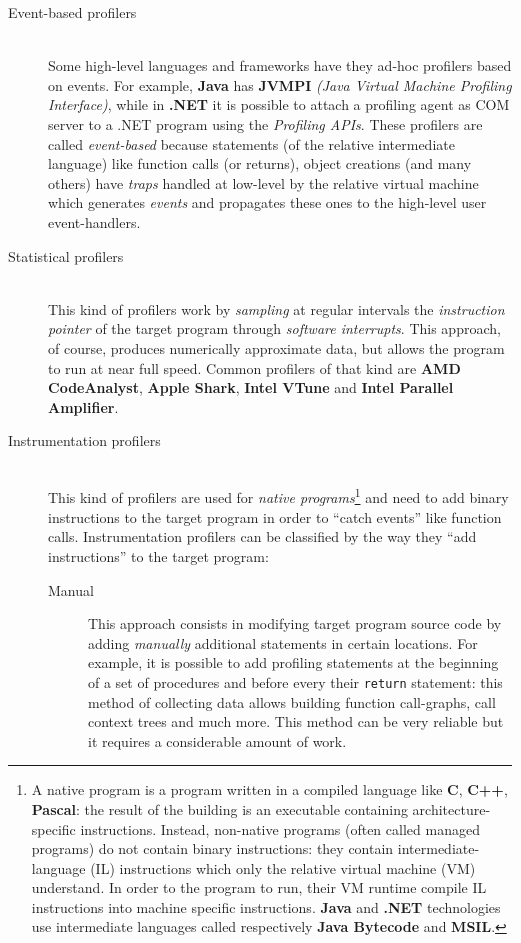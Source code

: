 \documentclass[a4paper,10pt]{report}
\begin{document}
\begin{description}
\item[Event-based profilers] \hfill \\
Some high-level languages and frameworks have they ad-hoc profilers based on
events. For example, \textbf{Java} has \textbf{JVMPI} \textit{(Java Virtual
Machine Profiling Interface)}, while in \textbf{.NET} it is possible to attach a
profiling agent as COM server to a .NET program using the \emph{Profiling APIs}.
These profilers are called \emph{event-based} because statements (of the
relative intermediate language) like function calls (or returns), object
creations (and many others) have \emph{traps} handled at low-level by the
relative virtual machine which generates \emph{events} and propagates these ones
to the high-level user event-handlers.

\item[Statistical profilers] \hfill \\
This kind of profilers work by \emph{sampling} at regular intervals the
\emph{instruction pointer} of the target program through \emph{software interrupts}.
This approach, of course, produces numerically approximate data, but allows the
program to run at near full speed. Common profilers of that kind are \textbf{AMD
CodeAnalyst}, \textbf{Apple Shark}, \textbf{Intel VTune} and \textbf{Intel
Parallel Amplifier}.

\item[Instrumentation profilers] \hfill \\
This kind of profilers are used for \emph{native programs}\footnote{A native
program is a program written in a compiled language like \textbf{C},
\textbf{C++}, \textbf{Pascal}: the result of the building is an executable
containing architecture-specific instructions. Instead, non-native programs (often called
managed programs) do not contain binary instructions: they contain
intermediate-language (IL) instructions which only the relative virtual machine
(VM) understand. In order to the program to run, their VM runtime compile IL
instructions into machine specific instructions. \textbf{Java} and \textbf{.NET}
technologies use intermediate languages called respectively \textbf{Java Bytecode} and
\textbf{MSIL}.} and need to add binary instructions to the target program in
order to ``catch events'' like function calls. Instrumentation profilers can be
classified by the way they ``add instructions'' to the target program:

\begin{description}
\item[Manual]
This approach consists in modifying target program source code by adding \emph{manually} 
additional statements in certain locations. For example, it is possible to add profiling
statements at the beginning of a set of procedures and before every their
\verb|return| statement: this method of collecting data allows building function
call-graphs, call context trees and much more. This method can be very
reliable but it requires a considerable amount of work.


\end{description}
\end{description}
\end{document}
